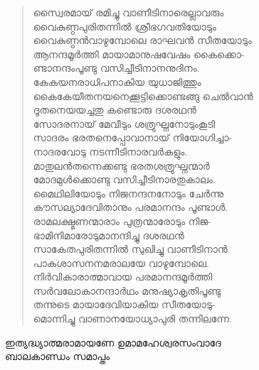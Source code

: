 \begin{verse}
സ്വൈരമായ് രമിച്ചു വാണീടിനാരെല്ലാവരും\\
വൈകുണ്ഠപുരിതന്നില്‍ ശ്രീഭഗവതിയോടും\\
വൈകുണ്ഠന്‍വാഴുമ്പോലെ രാഘവന്‍ സീതയോടും\\
ആനന്ദമൂര്‍ത്തി മായാമാനുഷവേഷം കൈക്കൊ-\\
ണ്ടാനന്ദംപൂണ്ടു വസിച്ചീടിനാനനുദിനം.\\
കേകയനരാധിപനാകിയ യുധാജിത്തും\\
കൈകേയീതനയനെക്കൂട്ടിക്കൊണ്ടങ്ങു ചെല്‍വാന്‍\\
ദൂതനെയയച്ചതു കണ്ടൊരു ദശരഥന്‍\\
സോദരനായ് മേവീടും ശത്രുഘ്നനോടുംകൂടി\\
സാദരം ഭരതനെപ്പോവാനായ് നിയോഗിച്ചാ-\\
നാദരവോടു നടന്നീടിനാരവര്‍കളും.\\
മാതുലന്‍തന്നെക്കണ്ടു ഭരതശത്രുഘ്നന്മാര്‍\\
മോദമുള്‍ക്കൊണ്ടു വസിച്ചീടിനാരതുകാലം.\\
മൈഥിലിയോടും നിജനന്ദനനോടും ചേര്‍ന്നു\\
കൗസല്യാദേവിതാനും പരമാനന്ദം പൂണ്ടാള്‍.\\
രാമലക്ഷ്മണന്മാരാം പുത്രന്മാരോടും നിജ-\\
ഭാമിനിമാരോടുമാനന്ദിച്ചു ദശരഥന്‍\\
സാകേതപുരിതന്നില്‍ സുഖിച്ചു വാണീടിനാന്‍\\
പാകശാസനനമരാലയേ വാഴുമ്പോലെ.\\
നിര്‍വികാരാത്മാവായ പരമാനന്ദമൂര്‍ത്തി\\
സര്‍വലോകാനന്ദാര്‍ഥം മനുഷ്യാകൃതിപൂണ്ടു\\
തന്നുടെ മായാദേവിയാകിയ സീതയോടു-\\
മൊന്നിച്ചു വാണാനയോധ്യാപുരി തന്നിലന്നേ.
\end{verse}

\begin{center}
ഇത്യദ്ധ്യാത്മരാമായണേ ഉമാമഹേശ്വരസംവാദേ\\
ബാലകാണ്ഡം സമാപ്തം
\end{center}
		



